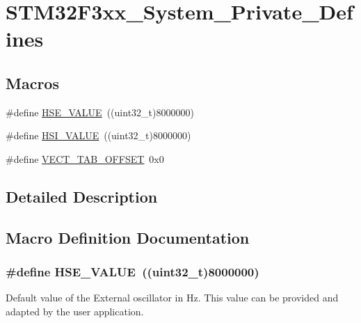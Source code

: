 \hypertarget{group___s_t_m32_f3xx___system___private___defines}{}\section{S\+T\+M32\+F3xx\+\_\+\+System\+\_\+\+Private\+\_\+\+Defines}
\label{group___s_t_m32_f3xx___system___private___defines}
\subsection*{Macros}
\begin{DoxyCompactItemize}
\item 
\#define \hyperlink{group___s_t_m32_f3xx___system___private___defines_gaeafcff4f57440c60e64812dddd13e7cb}{H\+S\+E\+\_\+\+V\+A\+L\+U\+E}~((uint32\+\_\+t)8000000)
\item 
\#define \hyperlink{group___s_t_m32_f3xx___system___private___defines_gaaa8c76e274d0f6dd2cefb5d0b17fbc37}{H\+S\+I\+\_\+\+V\+A\+L\+U\+E}~((uint32\+\_\+t)8000000)
\item 
\#define \hyperlink{group___s_t_m32_f3xx___system___private___defines_ga40e1495541cbb4acbe3f1819bd87a9fe}{V\+E\+C\+T\+\_\+\+T\+A\+B\+\_\+\+O\+F\+F\+S\+E\+T}~0x0
\end{DoxyCompactItemize}


\subsection{Detailed Description}


\subsection{Macro Definition Documentation}
\hypertarget{group___s_t_m32_f3xx___system___private___defines_gaeafcff4f57440c60e64812dddd13e7cb}{}
\subsubsection[{H\+S\+E\+\_\+\+V\+A\+L\+U\+E}]{\setlength{\rightskip}{0pt plus 5cm}\#define H\+S\+E\+\_\+\+V\+A\+L\+U\+E~((uint32\+\_\+t)8000000)}\label{group___s_t_m32_f3xx___system___private___defines_gaeafcff4f57440c60e64812dddd13e7cb}
Default value of the External oscillator in Hz. This value can be provided and adapted by the user application. 

